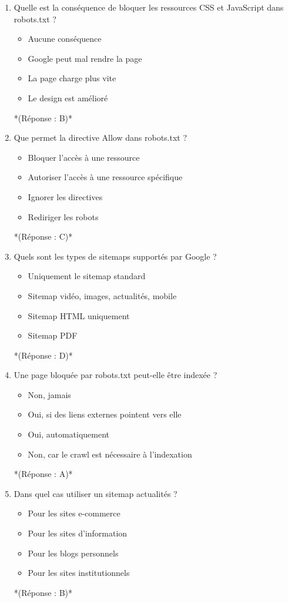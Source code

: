 \documentclass[12pt,a4paper,twoside]{report}
\begin{document}
\begin{enumerate}
\item Quelle est la conséquence de bloquer les ressources CSS et JavaScript dans robots.txt ?
\begin{itemize}
\item[A)] Aucune conséquence
\item[B)] Google peut mal rendre la page
\item[C)] La page charge plus vite
\item[D)] Le design est amélioré
\end{itemize}
*(Réponse : B)*

\item Que permet la directive Allow dans robots.txt ?
\begin{itemize}
\item[A)] Bloquer l'accès à une ressource
\item[B)] Autoriser l'accès à une ressource spécifique
\item[C)] Ignorer les directives
\item[D)] Rediriger les robots
\end{itemize}
*(Réponse : C)*

\item Quels sont les types de sitemaps supportés par Google ?
\begin{itemize}
\item[A)] Uniquement le sitemap standard
\item[B)] Sitemap vidéo, images, actualités, mobile
\item[C)] Sitemap HTML uniquement
\item[D)] Sitemap PDF
\end{itemize}
*(Réponse : D)*

\item Une page bloquée par robots.txt peut-elle être indexée ?
\begin{itemize}
\item[A)] Non, jamais
\item[B)] Oui, si des liens externes pointent vers elle
\item[C)] Oui, automatiquement
\item[D)] Non, car le crawl est nécessaire à l'indexation
\end{itemize}
*(Réponse : A)*

\item Dans quel cas utiliser un sitemap actualités ?
\begin{itemize}
\item[A)] Pour les sites e-commerce
\item[B)] Pour les sites d'information
\item[C)] Pour les blogs personnels
\item[D)] Pour les sites institutionnels
\end{itemize}
*(Réponse : B)*


\end{enumerate}
\end{document}
